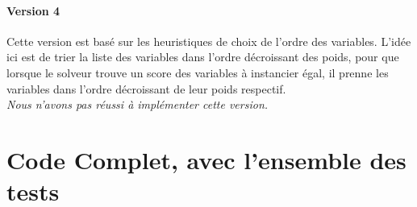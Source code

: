 \documentclass[11pt]{article} %
\begin{document}
\paragraph{Version 4} Cette version est basé sur les heuristiques de choix de l'ordre des variables.
L'idée ici est de trier la liste des variables dans l'ordre décroissant des poids, pour que lorsque le solveur trouve un score des variables à instancier égal, il prenne les variables dans l'ordre décroissant de leur poids respectif.\\
\textit{Nous n'avons pas réussi à implémenter cette version.}
\newpage

\section{Code Complet, avec l'ensemble des tests}

\end{document}
